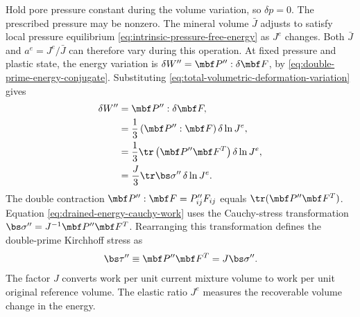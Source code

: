 Hold pore pressure constant during the volume variation, so \(\delta p=0\).
The prescribed pressure may be nonzero.
The mineral volume \(\bar J\) adjusts to satisfy local pressure equilibrium
\eqref{eq:intrinsic-pressure-free-energy}
as \(J^e\) changes.  Both \(\bar J\) and \(a^e=J^e/\bar J\) can therefore
vary during this operation.  At fixed pressure and plastic state, the
energy variation is
\(\delta W^{\prime\prime}=\mbf P^{\prime\prime}:\delta\mbf F\), by
\eqref{eq:double-prime-energy-conjugate}.  Substituting
\eqref{eq:total-volumetric-deformation-variation} gives
\begin{align}
 \delta W^{\prime\prime}
 &=\mbf P^{\prime\prime}:\delta\mbf F,
 \notag
\\
 &=\frac13\left(\mbf P^{\prime\prime}:\mbf F\right)
 \delta\ln J^e,
 \notag
\\
 &=\frac13\tr\left(\mbf P^{\prime\prime}\mbf F^T\right)
 \delta\ln J^e,
 \notag
\\
 &=\frac J3\tr\bs\sigma^{\prime\prime}\,\delta\ln J^e.
 \label{eq:drained-energy-cauchy-work}
\end{align}
The double contraction
\(\mbf P^{\prime\prime}:\mbf F= P^{\prime\prime}_{ij}F_{ij}\)
equals \(\tr(\mbf P^{\prime\prime}\mbf F^T)\).  Equation
\eqref{eq:drained-energy-cauchy-work} uses the Cauchy-stress transformation
\(\bs\sigma^{\prime\prime}=J^{-1}\mbf P^{\prime\prime}\mbf F^T\).
Rearranging this transformation defines the double-prime Kirchhoff stress as
\begin{equation*}
 \bs\tau^{\prime\prime}\equiv\mbf P^{\prime\prime}\mbf F^T
 =J\bs\sigma^{\prime\prime}.
\end{equation*}
The factor \(J\) converts work per unit current mixture volume to work per
unit original reference volume.  The elastic ratio \(J^e\) measures the
recoverable volume change in the energy.

